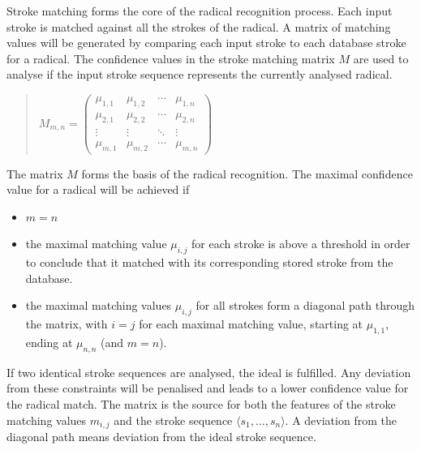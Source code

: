 Stroke matching forms the core of the radical recognition process.
Each input stroke is matched against all the strokes of the radical. 
A matrix of matching values will be generated by comparing each input stroke 
to each database stroke for a radical.
The confidence values in the stroke matching matrix \(M\) are used to analyse 
if the input stroke sequence represents the currently analysed radical.
\begin{quote}
\(
 M_{m,n} = 
 \begin{pmatrix}
  \mu_{1,1} & \mu_{1,2} & \cdots & \mu_{1,n} \\
  \mu_{2,1} & \mu_{2,2} & \cdots & \mu_{2,n} \\
  \vdots  & \vdots  & \ddots & \vdots  \\
  \mu_{m,1} & \mu_{m,2} & \cdots & \mu_{m,n} 
 \end{pmatrix}
\)
\end{quote}
The matrix \(M\) forms the basis of the radical recognition. The maximal 
confidence value for a radical will be achieved if
\begin{itemize}
  \item \( m = n \) 
  \item the maximal matching value \(\mu_{i,j}\) for each stroke is above a
        threshold in order to conclude that it matched with its corresponding 
        stored stroke from the database.
  \item the maximal matching values \(\mu_{i,j}\) for all strokes form a diagonal 
        path through the matrix, with \( i = j \) for each maximal matching 
        value, starting at \(\mu_{1,1}\), ending at 
        \(\mu_{n,n}\) (and \(m=n\)).
\end{itemize}
If two identical stroke sequences are analysed, the ideal is fulfilled.
Any deviation from these constraints will be penalised and leads to a lower
confidence value for the radical match. The matrix is the source for both 
the features of the stroke matching values \(m_{i,j}\) and the stroke sequence
\(\langle s_1,\ldots,s_n \rangle \). A deviation from the diagonal path means 
deviation from the ideal stroke sequence.



